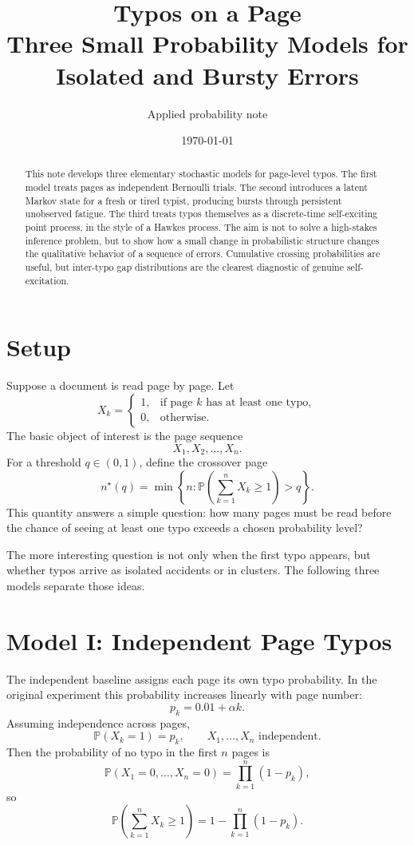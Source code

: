 \documentclass[11pt]{article}
\title{\textbf{Typos on a Page}\\
\large Three Small Probability Models for Isolated and Bursty Errors}
\author{Applied probability note}
\date{\today}
\newcommand{\Prb}{\mathbb{P}}
\begin{document}
\maketitle

\begin{abstract}
This note develops three elementary stochastic models for page-level typos.
The first model treats pages as independent Bernoulli trials. The second
introduces a latent Markov state for a fresh or tired typist, producing bursts
through persistent unobserved fatigue. The third treats typos themselves as a
discrete-time self-exciting point process, in the style of a Hawkes process.
The aim is not to solve a high-stakes inference problem, but to show how a
small change in probabilistic structure changes the qualitative behavior of a
sequence of errors. Cumulative crossing probabilities are useful, but
inter-typo gap distributions are the clearest diagnostic of genuine
self-excitation.
\end{abstract}

\section{Setup}

Suppose a document is read page by page. Let
\[
X_k =
\begin{cases}
1, & \text{if page } k \text{ has at least one typo},\\
0, & \text{otherwise}.
\end{cases}
\]
The basic object of interest is the page sequence
\[
X_1, X_2, \ldots, X_n.
\]
For a threshold \(q \in (0,1)\), define the crossover page
\[
n^\star(q) =
\min\left\{n : \Prb\left(\sum_{k=1}^n X_k \ge 1\right) > q\right\}.
\]
This quantity answers a simple question: how many pages must be read before
the chance of seeing at least one typo exceeds a chosen probability level?

The more interesting question is not only when the first typo appears, but
whether typos arrive as isolated accidents or in clusters. The following three
models separate those ideas.

\section{Model I: Independent Page Typos}

The independent baseline assigns each page its own typo probability. In the
original experiment this probability increases linearly with page number:
\[
p_k = 0.01 + \alpha k.
\]
Assuming independence across pages,
\[
\Prb(X_k=1) = p_k,
\qquad
X_1,\ldots,X_n \text{ independent}.
\]
Then the probability of no typo in the first \(n\) pages is
\[
\Prb(X_1=0,\ldots,X_n=0)
= \prod_{k=1}^n (1-p_k),
\]
so
\[
\Prb\left(\sum_{k=1}^n X_k \ge 1\right)
= 1 - \prod_{k=1}^n (1-p_k).
\]
\end{document}

